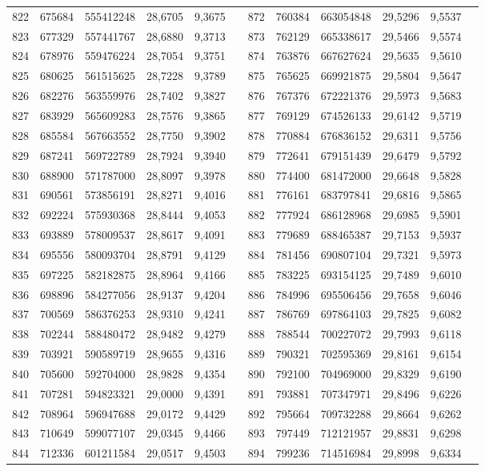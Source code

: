 \begin{longtable}{p{.17\linewidth}*{11}{S}}
822&675684&555412248&28,6705&9,3675&&872&760384&663054848&29,5296&9,5537\\
823&677329&557441767&28,6880&9,3713&&873&762129&665338617&29,5466&9,5574\\
824&678976&559476224&28,7054&9,3751&&874&763876&667627624&29,5635&9,5610\\
825&680625&561515625&28,7228&9,3789&&875&765625&669921875&29,5804&9,5647\\
826&682276&563559976&28,7402&9,3827&&876&767376&672221376&29,5973&9,5683\\
827&683929&565609283&28,7576&9,3865&&877&769129&674526133&29,6142&9,5719\\
828&685584&567663552&28,7750&9,3902&&878&770884&676836152&29,6311&9,5756\\
829&687241&569722789&28,7924&9,3940&&879&772641&679151439&29,6479&9,5792\\
830&688900&571787000&28,8097&9,3978&&880&774400&681472000&29,6648&9,5828\\
831&690561&573856191&28,8271&9,4016&&881&776161&683797841&29,6816&9,5865\\
832&692224&575930368&28,8444&9,4053&&882&777924&686128968&29,6985&9,5901\\
833&693889&578009537&28,8617&9,4091&&883&779689&688465387&29,7153&9,5937\\
834&695556&580093704&28,8791&9,4129&&884&781456&690807104&29,7321&9,5973\\
835&697225&582182875&28,8964&9,4166&&885&783225&693154125&29,7489&9,6010\\
836&698896&584277056&28,9137&9,4204&&886&784996&695506456&29,7658&9,6046\\
837&700569&586376253&28,9310&9,4241&&887&786769&697864103&29,7825&9,6082\\
838&702244&588480472&28,9482&9,4279&&888&788544&700227072&29,7993&9,6118\\
839&703921&590589719&28,9655&9,4316&&889&790321&702595369&29,8161&9,6154\\
840&705600&592704000&28,9828&9,4354&&890&792100&704969000&29,8329&9,6190\\
841&707281&594823321&29,0000&9,4391&&891&793881&707347971&29,8496&9,6226\\
842&708964&596947688&29,0172&9,4429&&892&795664&709732288&29,8664&9,6262\\
843&710649&599077107&29,0345&9,4466&&893&797449&712121957&29,8831&9,6298\\
844&712336&601211584&29,0517&9,4503&&894&799236&714516984&29,8998&9,6334\\

\end{longtable}

